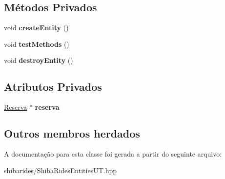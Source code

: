 \subsection*{Métodos Privados}
\begin{DoxyCompactItemize}
\item 
void {\bfseries create\+Entity} ()\hypertarget{classshibarides_1_1TUReserva_ab52ace69330270a883f871f8c57792d0}{}\label{classshibarides_1_1TUReserva_ab52ace69330270a883f871f8c57792d0}

\item 
void {\bfseries test\+Methods} ()\hypertarget{classshibarides_1_1TUReserva_a0f5c88672cf5bc1d90932ba32bb02b43}{}\label{classshibarides_1_1TUReserva_a0f5c88672cf5bc1d90932ba32bb02b43}

\item 
void {\bfseries destroy\+Entity} ()\hypertarget{classshibarides_1_1TUReserva_a930d266866fc5d0bec9789c1e659953a}{}\label{classshibarides_1_1TUReserva_a930d266866fc5d0bec9789c1e659953a}

\end{DoxyCompactItemize}
\subsection*{Atributos Privados}
\begin{DoxyCompactItemize}
\item 
\hyperlink{classshibarides_1_1Reserva}{Reserva} $\ast$ {\bfseries reserva}\hypertarget{classshibarides_1_1TUReserva_a81066f3e8c32477d0510c5ae6436dd87}{}\label{classshibarides_1_1TUReserva_a81066f3e8c32477d0510c5ae6436dd87}

\end{DoxyCompactItemize}
\subsection*{Outros membros herdados}


A documentação para esta classe foi gerada a partir do seguinte arquivo\+:\begin{DoxyCompactItemize}
\item 
shibarides/Shiba\+Rides\+Entities\+U\+T.\+hpp\end{DoxyCompactItemize}
